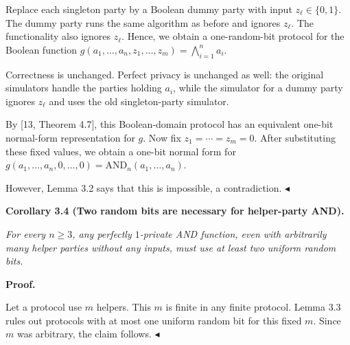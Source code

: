 Replace each singleton party by a Boolean dummy party with input
$z_{\ell}\in\{0,1\}$. The dummy party runs the same algorithm as before and
ignores $z_{\ell}$. The functionality also ignores $z_{\ell}$. Hence, we obtain a
one-random-bit protocol for the Boolean function
$g(a_{1},\dots,a_{n},z_{1},\dots,z_{m})=\bigwedge_{i=1}^{n}a_{i}$.\par




Correctness is unchanged. Perfect privacy is unchanged as well: the original
simulators handle the parties holding $a_{i}$, while the simulator for a dummy
party ignores $z_{\ell}$ and uses the old singleton-party simulator.\par




By [13, Theorem 4.7], this Boolean-domain protocol has an equivalent
one-bit normal-form representation for $g$. Now fix $z_{1}=\cdots=z_{m}=0$.
After substituting these fixed values, we
obtain a one-bit normal form for
$g(a_{1},\dots,a_{n},0,\dots,0)=\mathrm{AND}_{n}(a_{1},\dots,a_{n})$.\par




However, Lemma 3.2 says that this is impossible, a contradiction.
$\blacktriangleleft$\par





\par\medskip\noindent\textbf{
\textbf{Corollary 3.4}\textbf{ }(Two random bits are necessary for helper-party AND)\textbf{.}
}\par



\emph{For every $n\geq 3$, any perfectly $1$-private AND function, even with arbitrarily many helper parties without any inputs, must use at least two uniform random bits.}\par







\par\medskip\noindent\textbf{Proof.}\par




Let a protocol use $m$ helpers. This $m$ is finite in any finite protocol. Lemma 3.3 rules out protocols with at most one uniform random bit for this fixed $m$. Since $m$ was arbitrary, the claim follows.
$\blacktriangleleft$\par



